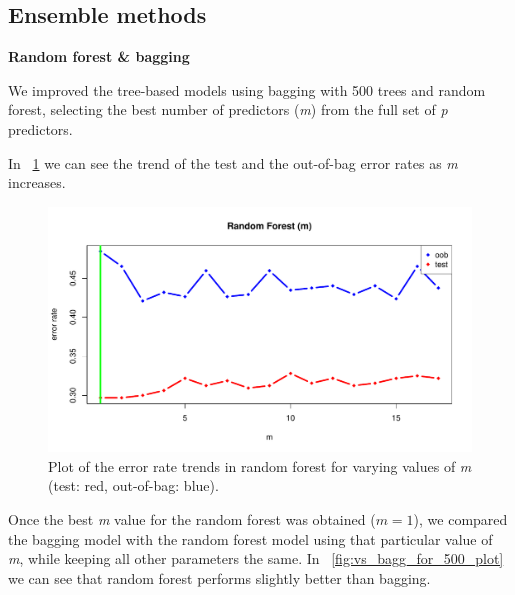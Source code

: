 \subsection{Ensemble methods}

\vspace{0.2cm}
\noindent
\textbf{Random forest \& bagging}

We improved the tree-based models using bagging with 500 trees and random forest, selecting the best number of predictors (\textit{m}) from the full set of \textit{p} predictors.

In \Fig~\ref{fig:m_best_for_500_plot} we can see the trend of the test and the out-of-bag error rates as \textit{m} increases.

\begin{figure}[h]
	\centering
	\includegraphics[width=0.5\linewidth]{ImageFiles/Classification/Trees/m_best_for_500_plot.pdf}
	\caption{Plot of the error rate trends in random forest for varying values of \textit{m} (test: red, out-of-bag: blue).}
	\label{fig:m_best_for_500_plot}
\end{figure}

Once the best \textit{m} value for the random forest was obtained ($m = 1$), we compared the bagging model with the random forest model using that particular value of \textit{m}, while keeping all other parameters the same.
In \Fig~\ref{fig:vs_bagg_for_500_plot} we can see that random forest performs slightly better than bagging.

